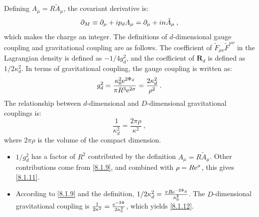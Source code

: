 Defining $A_{\mu}=R \tilde{A}_{\mu}$, the covariant derivative is:
\begin{equation}
	\partial_{M}\equiv\partial_{\mu}+i p_{d} A_{\mu}=\partial_{\mu}+i n \tilde{A}_{\mu} \:, \label{8.1.10}
\end{equation}
which makes the charge an integer.
The definitions of $d$-dimensional gauge coupling and gravitational coupling are as follows. The coefficient of $\tilde{F}_{\mu \nu} \tilde{F}^{\mu \nu}$ in the Lagrangian density is defined as $-1 / 4 g_{d}^{2}$, and the coefficient of $\bm{R}_{d}$ is defined as $1 / 2 \kappa_{d}^{2}$.
In terms of gravitational coupling, the gauge coupling is written as:
\begin{equation}
	g_{d}^{2}=\frac{\kappa_{0}^{2} \mathrm{e}^{2 \Phi_{d}}}{\pi R^{3} \mathrm{e}^{2 \sigma}}=\frac{2 \kappa_{d}^{2}}{\rho^{2}} \:. \label{8.1.11}
\end{equation}
The relationship between $d$-dimensional and $D$-dimensional gravitational couplings is:
\begin{equation}
	\frac{1}{\kappa_{d}^{2}}=\frac{2 \pi \rho}{\kappa^{2}} \:, \label{8.1.12}
\end{equation}
where $2 \pi \rho$ is the volume of the compact dimension.
\begin{tcolorbox}
	\begin{remark}
		\begin{itemize}
			\item $1 / g_{d}^{2}$ has a factor of $R^{2}$ contributed by the definition $A_{\mu}=R \tilde{A}_{\mu}$. Other contributions come from \eqref{8.1.9}, and combined with $\rho=R\mathrm{e}^{\sigma}$, this gives \eqref{8.1.11}.
			\item According to \eqref{8.1.9} and the definition, $1 / 2 \kappa_{d}^{2}=\frac{\pi R \mathrm{e}^{-2 \Phi_d}}{\kappa_{0}^{2}}$.
			The $D$-dimensional gravitational coupling is $\frac{1}{2 \kappa^{2}}=\frac{\mathrm{e}^{-2 \Phi}}{2 \kappa_{0}^{2}}$, which yields \eqref{8.1.12}.
		\end{itemize}
	\end{remark}
\end{tcolorbox}

